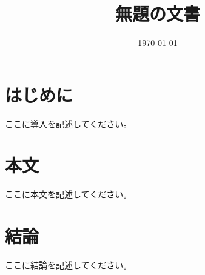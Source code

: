\documentclass{article}
\title{無題の文書}
\author{}
\date{\today}
\begin{document}
\maketitle

\section{はじめに}
ここに導入を記述してください。

\section{本文}
ここに本文を記述してください。

\section{結論}
ここに結論を記述してください。
\end{document}
